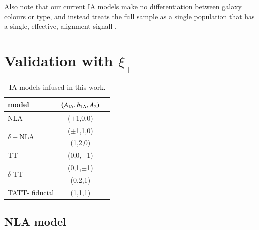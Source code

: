 \documentclass[useAMS,usenatbib]{mn2e}
\begin{document}
Also note that our current IA models make no differentiation between galaxy colours or type, and instead treats the full sample as a single population that has a single, effective, alignment signall \citep[see][for an example with a red/blue split]{DESY1_IA_Samuroff}.


\section{Validation with $\xi_{\pm}$}
\label{sec:validation}




\begin{table}
   \centering
   \begin{tabular}{@{} lcr @{}} %
      \hline
      \hline
      model   		& ($A_{\rm IA}, b_{\rm TA}, A_2)$ \\
      \hline
      NLA     		& {($\pm$1,0,0) }&  \\
      \multirow{2}{*}{$\delta-$NLA }  	&   {($\pm$1,1,0)}   \\
      							&  {(1,2,0)}   \\
      TT 			&  {(0,0,$\pm$1)} &  \\
      \multirow{2}{*}{$\delta$-TT} 	&  {(0,1,$\pm$1)}   \\
      				&  {(0,2,1)}   \\
      TATT- fiducial	&  { (1,1,1)}  \\
      \hline
      \hline

   \end{tabular}
   \caption{IA models infused in this work.}
   \label{table:IAmodels}
\end{table}


\subsection{NLA model}
\label{subsubsec:sigma_G}
\end{document}
